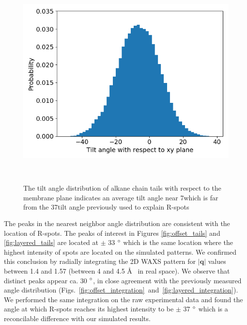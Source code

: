 \documentclass{article}
\begin{document}
  \begin{figure}
  \centering
  \includegraphics[width=0.5\linewidth]{tilt_dist.png}
  \caption{The tilt angle distribution of alkane chain tails with respect to the membrane plane
  indicates an average tilt angle near 7\degree which is far from the 37\degree tilt angle 
  previously used to explain R-spots}~\label{fig:tilt}
  \end{figure}

  The peaks in the nearest neighbor angle distribution are consistent with the
  location of R-spots. The peaks of interest in Figures \ref{fig:offset_tails}
  and \ref{fig:layered_tails} are located at $\pm$ 33 $\degree$ which is the same
  location where the highest intensity of spots are located on the simulated
  patterns. We confirmed this conclusion by radially integrating the 2D WAXS
  pattern for $\left|\mathbf{q}\right|$ values between 1.4 and 1.57 (between 4
  and 4.5 \AA~ in real space). We observe that distinct peaks appear ca. 30
  $\degree$, in close agreement with the previously measured angle distribution
  (Figs.~\ref{fig:offset_integration}~and~\ref{fig:layered_integration}). We
  performed the same integration on the raw experimental data and found the angle
  at which R-spots reaches its highest intensity to be $\pm$ 37 $\degree$ which
  is a reconcilable difference with our simulated results.  
\end{document}
